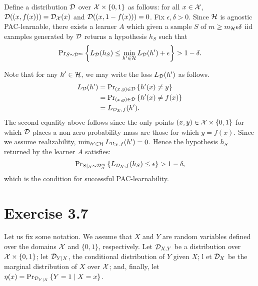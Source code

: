 Define a distribution $\mathcal{D}$ over $\mathcal{X} \times \{0, 1\}$ as follows: for all
$x \in \mathcal{X}$, $\mathcal{D}( (x, f(x)) ) = \mathcal{D}_{\mathcal{X}}(x)$ and $\mathcal{D}( (x, 1 - f(x)))
= 0$. Fix $\epsilon, \delta > 0$. Since $\mathcal{H}$ is agnostic PAC-learnable,
there exists a learner $A$ which given a sample $S$ of $m \geq
m_{\mathcal{H}}{\epsilon}{\delta}$ iid examples generated by $\mathcal{D}$ returns a
hypothesis $h_S$ such that
\[
    \text{Pr}_{S \sim \mathcal{D}^m} \left \{ L_{\mathcal{D}} (h_S) \leq 
        \min_{h' \in \mathcal{H}} L_{\mathcal{D}} (h') + \epsilon \right \} > 1 - \delta.
\] 

Note that for any $h' \in \mathcal{H}$, we may write the loss $L_{\mathcal{D}} (h')$ as follows. 
\begin{align*}
    L_{\mathcal{D}} (h') & = \text{Pr}_{(x, y) \in \mathcal{D}} \left \{  h'(x) \neq y \right \} \\
                   & = \text{Pr}_{(x, y) \in \mathcal{D}} \left \{  h'(x) \neq f(x) \right \} \\
                   & = L_{\mathcal{D}_{\mathcal{X}}, f} (h').
\end{align*}
The second equality above follows since the only points $(x, y) \in \mathcal{X} \times \{0, 1\}$
for which $\mathcal{D}$ places a non-zero probability mass are those for which $y = f(x)$. Since 
we assume realizability, $ \min_{h' \in \mathcal{H}} L_{\mathcal{D}_{\mathcal{X}}, f} (h') = 0$. Hence 
the hypothesis $h_S$ returned by the learner $A$ satisfies:
\[
    \text{Pr}_{S|_{\mathcal{X}} \sim \mathcal{D}_{\mathcal{X}}^m} \left \{ L_{\mathcal{D}_{\mathcal{X}}, f} (h_S) \leq \epsilon \right \} 
        > 1 - \delta,
\] 
which is the condition for successful PAC-learnability.

\section*{Exercise 3.7} Let us fix some notation. We assume that $X$ and $Y$ are 
random variables defined over the domains $\mathcal{X}$ and $\{0, 1\}$, respectively. 
Let $\mathcal{D}_{X, Y}$ be a distribution over $\mathcal{X} \times \{0, 1\}$; 
let $\mathcal{D}_{Y \mid X}$, the conditional distribution of $Y$ given $X$; l
et $\mathcal{D}_{X}$ be the marginal distribution of $X$ over $\mathcal{X}$; and, finally, let 
$\eta(x) = \text{Pr}_{\mathcal{D}_{Y \mid X}} \left \{ Y = 1 \mid X = x \right \}$. 


